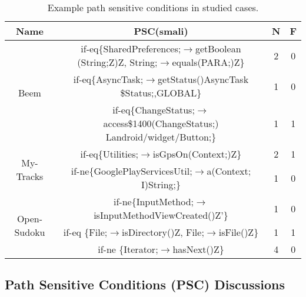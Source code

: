 \begin{table}[!t]
\centering
\begin{threeparttable}[b]
\caption{Example path sensitive conditions in studied cases. } 
\newcommand{\tabincell}[2]{\begin{tabular}{@{}#1@{}}#2\end{tabular}}
\footnotesize

\begin{tabular}{|c|c|c|c|}
\hline 
Name &  PSC(smali) & N & F\\
\hline 
\hline 
\multirow{6}{0.8cm}{Beem }& \multirow{2}{5.8cm}{if-eq\{SharedPreferences;$\rightarrow$getBoolean (String;Z)Z, 
String;$\rightarrow$equals(PARA;)Z\} } & \multirow{2}{*}{2}  & \multirow{2}{*}{0}\\
&&&\\
\cline{2-4}
 & \multirow{2}{5.8cm}{if-eq\{AsyncTask;$\rightarrow$getStatus()AsyncTask \$Status;,GLOBAL\}}  &\multirow{2}{*}{1} & \multirow{2}{*}{0}\\

&&&\\
 \cline{2-4}
  & \multirow{2}{5.8cm}{if-eq\{ChangeStatus;$\rightarrow$access\$1400(ChangeStatus;) Landroid/widget/Button;\}} &\multirow{2}{*}{1} & \multirow{2}{*}{1}\\
  &&&\\
\hline 
\multirow{2}{0.8cm}{My- Tracks}  &if-eq\{Utilities;$\rightarrow$isGpsOn(Context;)Z\} & 2 &1\\
\cline{2-4} 
 &if-ne\{GooglePlayServicesUtil;$\rightarrow$a(Context; I)String;\} & 1 & 0\\
\hline 
\multirow{3}{0.8cm}{Open- Sudoku}  & if-ne\{InputMethod;$\rightarrow$isInputMethodViewCreated()Z'\}  & 1&  0\\
\cline{2-4}
 & if-eq \{File;$\rightarrow$isDirectory()Z, File;$\rightarrow$isFile()Z\} &1&  1\\
\cline{2-4}
   & if-ne \{Iterator;$\rightarrow$hasNext()Z\}& 4&  0\\
\hline 
\end{tabular}
\label{tb2: experiment2}  
\end{threeparttable}
\end{table}
%
\subsection{Path Sensitive Conditions (PSC) Discussions}

